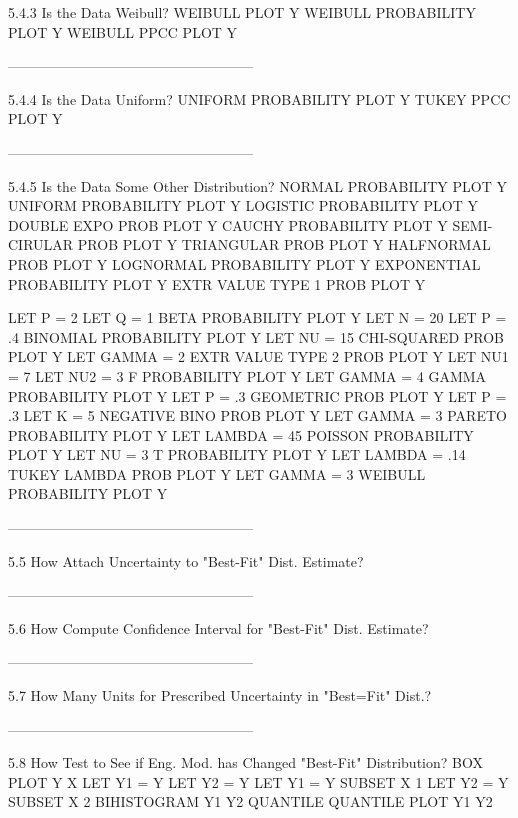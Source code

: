 5.4.3
Is the Data Weibull?
      WEIBULL PLOT Y
      WEIBULL PROBABILITY PLOT Y
      WEIBULL PPCC PLOT Y
 
-----------------------------------------------------
 
5.4.4
Is the Data Uniform?
       UNIFORM PROBABILITY PLOT Y
       TUKEY PPCC PLOT Y
 
-----------------------------------------------------
 
5.4.5
Is the Data Some Other Distribution?
      NORMAL PROBABILITY PLOT Y
      UNIFORM PROBABILITY PLOT Y
      LOGISTIC PROBABILITY PLOT Y
      DOUBLE EXPO PROB PLOT Y
      CAUCHY PROBABILITY PLOT Y
      SEMI-CIRULAR PROB PLOT Y
      TRIANGULAR PROB PLOT Y
      HALFNORMAL PROB PLOT Y
      LOGNORMAL PROBABILITY PLOT Y
      EXPONENTIAL PROBABILITY PLOT Y
      EXTR VALUE TYPE 1 PROB PLOT Y
 
      LET P = 2
      LET Q = 1
      BETA PROBABILITY PLOT Y
      LET N = 20
      LET P = .4
      BINOMIAL PROBABILITY PLOT Y
      LET NU = 15
      CHI-SQUARED PROB PLOT Y
      LET GAMMA = 2
      EXTR VALUE TYPE 2 PROB PLOT Y
      LET NU1 = 7
      LET NU2 = 3
      F PROBABILITY PLOT Y
      LET GAMMA = 4
      GAMMA PROBABILITY PLOT Y
      LET P = .3
      GEOMETRIC PROB PLOT Y
      LET P = .3
      LET K = 5
      NEGATIVE BINO PROB PLOT Y
      LET GAMMA = 3
      PARETO PROBABILITY PLOT Y
      LET LAMBDA = 45
      POISSON PROBABILITY PLOT Y
      LET NU = 3
      T PROBABILITY PLOT Y
      LET LAMBDA = .14
      TUKEY LAMBDA PROB PLOT Y
      LET GAMMA = 3
      WEIBULL PROBABILITY PLOT Y
 
-----------------------------------------------------
 
5.5
How Attach Uncertainty to "Best-Fit" Dist. Estimate?
 
-----------------------------------------------------
 
5.6
How Compute Confidence Interval for "Best-Fit" Dist. Estimate?
 
-----------------------------------------------------
 
5.7
How Many Units for Prescribed Uncertainty in "Best=Fit" Dist.?
 
-----------------------------------------------------
 
5.8
How Test to See if Eng. Mod. has Changed "Best-Fit" Distribution?
      BOX PLOT Y X
      LET Y1 = Y
      LET Y2 = Y
      LET Y1 = Y SUBSET X 1
      LET Y2 = Y SUBSET X 2
      BIHISTOGRAM Y1 Y2
      QUANTILE QUANTILE PLOT Y1 Y2
 

